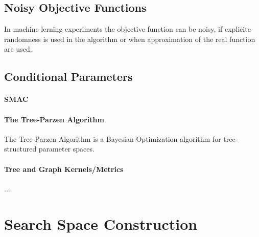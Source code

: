 \documentclass[english]{article}
\begin{document}
\subsection{Noisy Objective Functions}
In machine lerning experiments the objective function can be noisy, if explicite randomness is used in the algorithm or when approximation of the real function are used.
\subsection{Conditional Parameters}

\paragraph{SMAC}

\paragraph{The Tree-Parzen Algorithm}
The Tree-Parzen Algorithm \cite{bergstra_algorithms_2011} is a Bayesian-Optimization algorithm for tree-structured parameter spaces.

\paragraph{Tree and Graph Kernels/Metrics}
...



\section{Search Space Construction}
\end{document}
